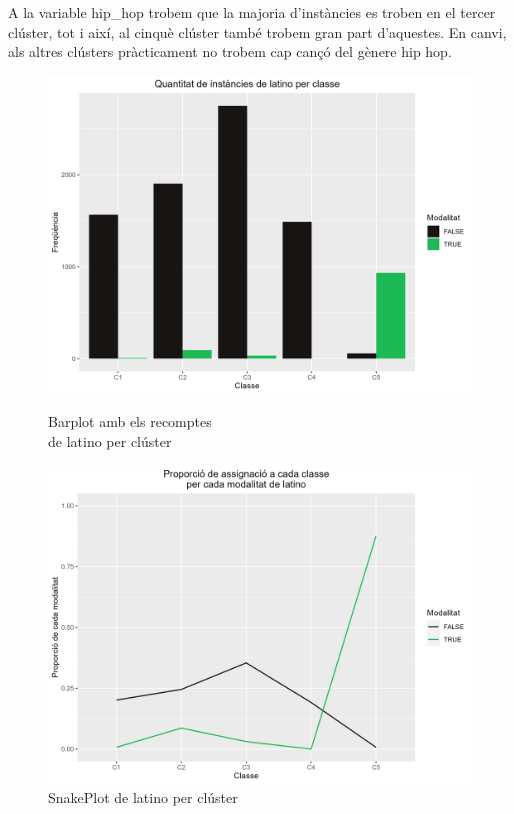 A la variable hip\_hop trobem que la majoria d'instàncies es troben en el tercer clúster, tot i així, al cinquè clúster també trobem gran part d'aquestes. En canvi, als altres clústers pràcticament no trobem cap cançó del gènere hip hop.

\begin{figure}[H]
\centering
    \begin{minipage}{.49\textwidth}
        \centering
        \includegraphics[width=0.95\linewidth]{Images/5_Profiling/categoriques/cat/Cat_BarPlot_latino.png}
        \caption{Barplot amb els recomptes \\ de latino per clúster}
        \label{fig:Cat_BarPlot_latino}
    \end{minipage}%
    \begin{minipage}{.49\textwidth}
        \centering
        \includegraphics[width=0.95\linewidth]{Images/5_Profiling/categoriques/cat/Cat_SnakePlot_latino.png}
        \caption{SnakePlot de latino per clúster}
        \label{fig:Cat_SnakePlot_latino}
    \end{minipage}%
\end{figure}

